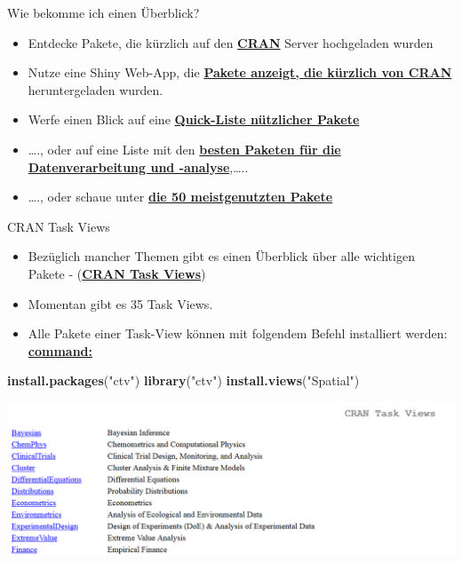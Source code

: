\documentclass[ignorenonframetext,]{beamer}
\newenvironment{Shaded}{\begin{snugshade}}{\end{snugshade}}
\newcommand{\KeywordTok}[1]{\textcolor[rgb]{0.13,0.29,0.53}{\textbf{#1}}}
\newcommand{\StringTok}[1]{\textcolor[rgb]{0.31,0.60,0.02}{#1}}
\newcommand{\NormalTok}[1]{#1}
\providecommand{\tightlist}{%
  \setlength{\itemsep}{0pt}\setlength{\parskip}{0pt}}
\begin{document}
\begin{frame}{Wie bekomme ich einen Überblick?}

\begin{itemize}
\item
  Entdecke Pakete, die kürzlich auf den
  \href{https://mran.microsoft.com/packages/}{\textbf{CRAN}} Server
  hochgeladen wurden
\item
  Nutze eine Shiny Web-App, die
  \href{https://gallery.shinyapps.io/cran-gauge/}{\textbf{Pakete
  anzeigt, die kürzlich von CRAN}} heruntergeladen wurden.
\item
  Werfe einen Blick auf eine
  \href{https://support.rstudio.com/hc/en-us/articles/201057987-Quick-list-of-useful-R-packages}{\textbf{Quick-Liste
  nützlicher Pakete}}
\item
  \ldots{}., oder auf eine Liste mit den
  \href{http://www.computerworld.com/article/2921176/business-intelligence/great-r-packages-for-data-import-wrangling-visualization.html}{\textbf{besten
  Paketen für die Datenverarbeitung und -analyse}},\ldots{}..
\item
  \ldots{}., oder schaue unter
  \href{https://www.r-bloggers.com/the-50-most-used-r-packages/}{\textbf{die
  50 meistgenutzten Pakete}}
\end{itemize}

\end{frame}

\begin{frame}[fragile]{CRAN Task Views}

\begin{itemize}
\tightlist
\item
  Bezüglich mancher Themen gibt es einen Überblick über alle wichtigen
  Pakete - (\href{https://cran.r-project.org/web/views/}{\textbf{CRAN
  Task Views}})
\item
  Momentan gibt es 35 Task Views.
\item
  Alle Pakete einer Task-View können mit folgendem Befehl installiert
  werden:
  \href{https://mran.microsoft.com/rpackages/}{\textbf{command:}}
\end{itemize}

\begin{Shaded}
\begin{Highlighting}[]
\KeywordTok{install.packages}\NormalTok{(}\StringTok{"ctv"}\NormalTok{)}
\KeywordTok{library}\NormalTok{(}\StringTok{"ctv"}\NormalTok{)}
\KeywordTok{install.views}\NormalTok{(}\StringTok{"Spatial"}\NormalTok{)}
\end{Highlighting}
\end{Shaded}

\includegraphics{figure/CRANtaskViews.PNG}

\end{frame}
\end{document}
